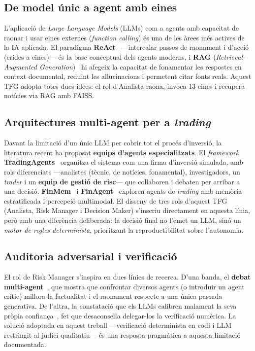 \documentclass[12pt, a4paper]{report}
\begin{document}
\subsection{De model únic a agent amb eines}

L'aplicació de \textit{Large Language Models} (LLMs) com a agents amb capacitat de raonar i usar eines externes (\textit{function calling}) és una de les àrees més actives de la IA aplicada. El paradigma \textbf{ReAct}~\cite{yao2023react} ---intercalar passos de raonament i d'acció (crides a eines)--- és la base conceptual dels agents moderns, i \textbf{RAG} (\textit{Retrieval-Augmented Generation})~\cite{lewis2020} hi afegeix la capacitat de fonamentar les respostes en context documental, reduint les al\textperiodcentered{}lucinacions i permetent citar fonts reals. Aquest TFG adopta totes dues idees: el rol d'Analista raona, invoca 13 eines i recupera notícies via RAG amb FAISS.

\subsection{Arquitectures multi-agent per a \textit{trading}}

Davant la limitació d'un únic LLM per cobrir tot el procés d'inversió, la literatura recent ha proposat \textbf{equips d'agents especialitzats}. El \textit{framework} \textbf{TradingAgents}~\cite{xiao2024tradingagents} organitza el sistema com una firma d'inversió simulada, amb rols diferenciats ---analistes (tècnic, de notícies, fonamental), investigadors, un \textit{trader} i un \textbf{equip de gestió de risc}--- que col\textperiodcentered{}laboren i debaten per arribar a una decisió. \textbf{FinMem}~\cite{yu2023finmem} i \textbf{FinAgent}~\cite{zhang2024finagent} exploren agents de \textit{trading} amb memòria estratificada i percepció multimodal. El disseny de tres rols d'aquest TFG (Analista, Risk Manager i Decision Maker) s'inscriu directament en aquesta línia, però amb una diferència deliberada: la decisió final no l'emet un LLM, sinó un \emph{motor de regles determinista}, prioritzant la reproductibilitat sobre l'autonomia.

\subsection{Auditoria adversarial i verificació}

El rol de Risk Manager s'inspira en dues línies de recerca. D'una banda, el \textbf{debat multi-agent}~\cite{du2023debate}, que mostra que confrontar diversos agents (o introduir un agent crític) millora la factualitat i el raonament respecte a una única passada generativa. De l'altra, la constatació que els LLMs calibren malament la seva pròpia confiança~\cite{xiong2024}, fet que desaconsella delegar-los la verificació numèrica. La solució adoptada en aquest treball ---verificació determinista en codi i LLM restringit al judici qualitatiu--- és una resposta pragmàtica a aquesta limitació documentada.
\end{document}
